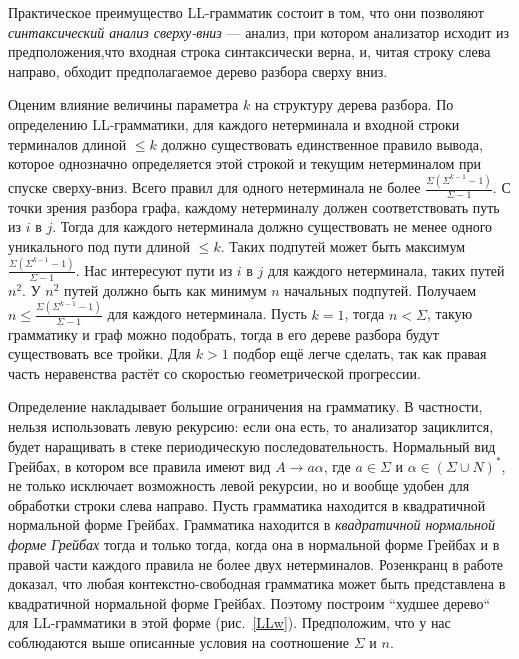 Практическое  преимущество  LL-грамматик состоит в том, что они позволяют \textit{синтаксический анализ сверху-вниз} --- анализ, при котором анализатор исходит из предположения,что входная строка синтаксически верна, и, читая строку слева направо, обходит предполагаемое дерево разбора сверху вниз.\par
Оценим влияние величины параметра $k$ на структуру дерева разбора. По определению LL-грамматики, для каждого нетерминала и входной строки терминалов длиной $\le k$ должно существовать единственное правило вывода, которое однозначно определяется этой строкой и текущим нетерминалом при спуске сверху-вниз. Всего правил для одного нетерминала не более $\frac{\Sigma(\Sigma^{k-1} - 1)}{\Sigma -1}$. С точки зрения разбора графа, каждому нетерминалу должен соответствовать путь из $i$ в $j$. Тогда для каждого нетерминала должно существовать не менее одного уникального под пути длиной $\le k$. Таких подпутей может быть максимум $\frac{\Sigma(\Sigma^{k-1} - 1)}{\Sigma -1}$.  Нас интересуют пути из $i$ в $j$ для каждого нетерминала, таких путей $n^2$. У $n^2$ путей должно быть как минимум $n$ начальных подпутей. Получаем $n \le \frac{\Sigma(\Sigma^{k-1} - 1)}{\Sigma -1}$ для каждого нетерминала. Пусть $k = 1$, тогда $n < \Sigma$, такую грамматику и граф можно подобрать, тогда в его дереве разбора будут существовать все тройки. Для $k > 1$ подбор ещё легче сделать, так как правая часть неравенства растёт со скоростью геометрической прогрессии. \par
Определение накладывает большие ограничения на грамматику. В частности, нельзя использовать левую рекурсию: если она есть, то анализатор зациклится, будет наращивать в стеке периодическую последовательность. Нормальный вид Грейбах, в котором все правила имеют вид $A \rightarrow a \alpha$, где $a \in \Sigma$ и $\alpha \in (\Sigma \cup N)^*$, не только исключает возможность левой рекурсии, но и вообще удобен для обработки строки слева направо. Пусть грамматика находится в квадратичной нормальной форме Грейбах. Грамматика находится в \textit{квадратичной нормальной форме Грейбах} тогда и только тогда, когда она в нормальной форме Грейбах и в правой части каждого правила не более двух нетерминалов. Розенкранц в работе \cite{QuadGreib} доказал, что любая контекстно-свободная грамматика может быть представлена в квадратичной нормальной форме Грейбах. Поэтому построим ``худшее дерево`` для LL-грамматики в этой форме (рис.~\ref{LLw}). Предположим, что у нас соблюдаются выше описанные условия на соотношение $\Sigma$ и $n$.
\\
